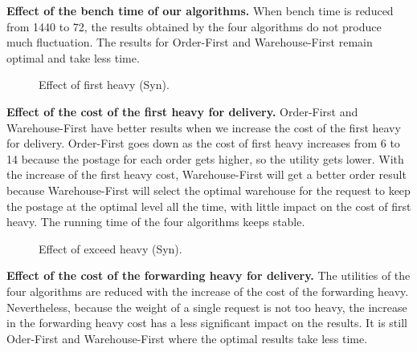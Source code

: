 \textbf{Effect of the bench time of our algorithms.} When bench time is reduced from 1440 to 72, the results obtained by the four algorithms do not produce much fluctuation. The results for Order-First and Warehouse-First remain optimal and take less time.

\begin{figure}[t!]\centering
	\subfigcapskip=-5pt
	\hfill
	\addtocounter{subfigure}{-1}\vspace{-3ex}
	\figureCaptionMargin
	\vspace{-1ex}
	\caption{\small Effect of first heavy (Syn).}\figureBelowMargin
	\label{fig:syn_17}
\end{figure}

\textbf{Effect of the cost of the first heavy for delivery.} Order-First and Warehouse-First have better results when we increase the cost of the first heavy for delivery. Order-First goes down as the cost of first heavy increases from 6 to 14 because the postage for each order gets higher, so the utility gets lower. With the increase of the first heavy cost, Warehouse-First will get a better order result because Warehouse-First will select the optimal warehouse for the request to keep the postage at the optimal level all the time, with little impact on the cost of first heavy. The running time of the four algorithms keeps stable.

\begin{figure}[t!]\centering
	\subfigcapskip=-5pt
	\hfill
	\addtocounter{subfigure}{-1}\vspace{-3ex}
	\figureCaptionMargin
	\vspace{-1ex}
	\caption{\small Effect of exceed heavy (Syn).}\figureBelowMargin
	\label{fig:syn_18}
\end{figure}

\textbf{Effect of the cost of the forwarding heavy for delivery.} The utilities of the four algorithms are reduced with the increase of the cost of the forwarding heavy. Nevertheless, because the weight of a single request is not too heavy, the increase in the forwarding heavy cost has a less significant impact on the results. It is still Oder-First and Warehouse-First where the optimal results take less time.


